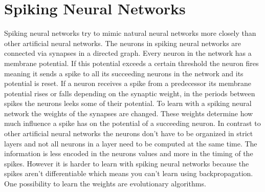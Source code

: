 \section{Spiking Neural Networks}
\label{sec:spiking}
Spiking neural networks try to mimic natural neural networks more closely than other artificial neural networks.
The neurons in spiking neural networks are connected via synapses in a directed graph.
Every neuron in the network has a membrane potential.
If this potential exceeds a certain threshold the neuron fires meaning it sends a spike to all its succeeding neurons in the network and its potential is reset.
If a neuron receives a spike from a predecessor its membrane potential rises or falls depending on the synaptic weight, in the periods between spikes the neurons leeks some of their potential.
To learn with a spiking neural network the weights of the synapses are changed.
These weights determine how much influence a spike has on the potential of a succeeding neuron.
In contrast to other artificial neural networks the neurons don't have to be organized in strict layers and not all neurons in a layer need to be computed at the same time.
The information is less encoded in the neurons values and more in the timing of the spikes.
However it is harder to learn with spiking neural networks because the spikes aren't differentiable which means you can't learn using backpropagation.
One possibility to learn the weights are evolutionary algorithms.